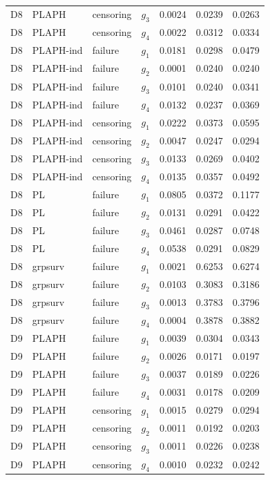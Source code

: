 \begin{longtable}{clllrrr}
D8 & PLAPH & censoring & $g_{3}$ & 0.0024 & 0.0239 & 0.0263 \\
D8 & PLAPH & censoring & $g_{4}$ & 0.0022 & 0.0312 & 0.0334 \\
D8 & PLAPH-ind & failure & $g_{1}$ & 0.0181 & 0.0298 & 0.0479 \\
D8 & PLAPH-ind & failure & $g_{2}$ & 0.0001 & 0.0240 & 0.0240 \\
D8 & PLAPH-ind & failure & $g_{3}$ & 0.0101 & 0.0240 & 0.0341 \\
D8 & PLAPH-ind & failure & $g_{4}$ & 0.0132 & 0.0237 & 0.0369 \\
D8 & PLAPH-ind & censoring & $g_{1}$ & 0.0222 & 0.0373 & 0.0595 \\
D8 & PLAPH-ind & censoring & $g_{2}$ & 0.0047 & 0.0247 & 0.0294 \\
D8 & PLAPH-ind & censoring & $g_{3}$ & 0.0133 & 0.0269 & 0.0402 \\
D8 & PLAPH-ind & censoring & $g_{4}$ & 0.0135 & 0.0357 & 0.0492 \\
D8 & PL & failure & $g_{1}$ & 0.0805 & 0.0372 & 0.1177 \\
D8 & PL & failure & $g_{2}$ & 0.0131 & 0.0291 & 0.0422 \\
D8 & PL & failure & $g_{3}$ & 0.0461 & 0.0287 & 0.0748 \\
D8 & PL & failure & $g_{4}$ & 0.0538 & 0.0291 & 0.0829 \\
D8 & grpsurv & failure & $g_{1}$ & 0.0021 & 0.6253 & 0.6274 \\
D8 & grpsurv & failure & $g_{2}$ & 0.0103 & 0.3083 & 0.3186 \\
D8 & grpsurv & failure & $g_{3}$ & 0.0013 & 0.3783 & 0.3796 \\
D8 & grpsurv & failure & $g_{4}$ & 0.0004 & 0.3878 & 0.3882 \\
D9 & PLAPH & failure & $g_{1}$ & 0.0039 & 0.0304 & 0.0343 \\
D9 & PLAPH & failure & $g_{2}$ & 0.0026 & 0.0171 & 0.0197 \\
D9 & PLAPH & failure & $g_{3}$ & 0.0037 & 0.0189 & 0.0226 \\
D9 & PLAPH & failure & $g_{4}$ & 0.0031 & 0.0178 & 0.0209 \\
D9 & PLAPH & censoring & $g_{1}$ & 0.0015 & 0.0279 & 0.0294 \\
D9 & PLAPH & censoring & $g_{2}$ & 0.0011 & 0.0192 & 0.0203 \\
D9 & PLAPH & censoring & $g_{3}$ & 0.0011 & 0.0226 & 0.0238 \\
D9 & PLAPH & censoring & $g_{4}$ & 0.0010 & 0.0232 & 0.0242 \\

\end{longtable}
